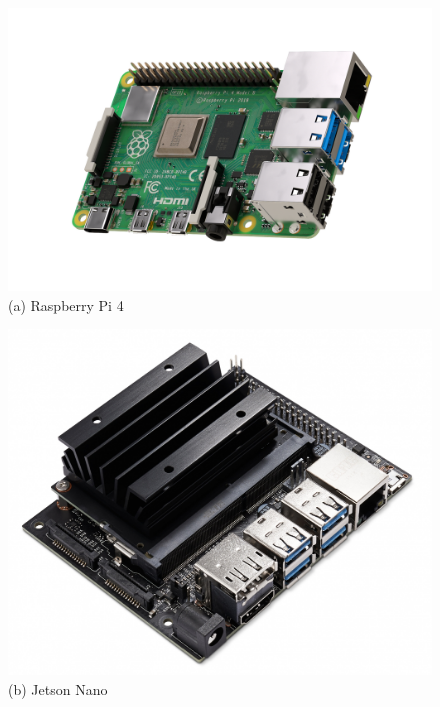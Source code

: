 \begin{figure} [H]
	\centering
    \begin{minipage}{.5\textwidth}
      \centering
      \includegraphics[width=\linewidth]{Images/Design-Implementation/raspberry-pi-4.png}\\
      {(a) Raspberry Pi 4 }
    \end{minipage}%
    \begin{minipage}{.5\textwidth}
      \centering
      \includegraphics[width=.9\linewidth]{Images/Design-Implementation/jetson-nano.jpeg}\\
      {(b) Jetson Nano }
	\end{minipage}
    \hfill \break
    \decoRule
    \label{fig:Antenna-Arrays}
\end{figure}

